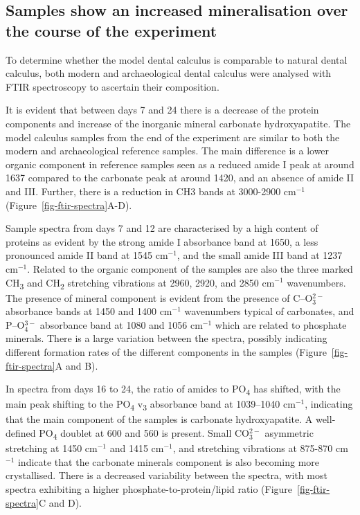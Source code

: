 \documentclass[
  b5paper,
]{book}
\begin{document}
\subsection{Samples show an increased mineralisation over the course of
the
experiment}\label{samples-show-an-increased-mineralisation-over-the-course-of-the-experiment}

To determine whether the model dental calculus is comparable to natural
dental calculus, both modern and archaeological dental calculus were
analysed with FTIR spectroscopy to ascertain their composition.

It is evident that between days 7 and 24 there is a decrease of the
protein components and increase of the inorganic mineral carbonate
hydroxyapatite. The model calculus samples from the end of the
experiment are similar to both the modern and archaeological reference
samples. The main difference is a lower organic component in reference
samples seen as a reduced amide I peak at around 1637 compared to the
carbonate peak at around 1420, and an absence of amide II and III.
Further, there is a reduction in CH3 bands at 3000-2900 cm\(^{-1}\)
(Figure~\ref{fig-ftir-spectra}A-D).

Sample spectra from days 7 and 12 are characterised by a high content of
proteins as evident by the strong amide I absorbance band at 1650, a
less pronounced amide II band at 1545 cm\(^{-1}\), and the small amide
III band at 1237 cm\(^{-1}\). Related to the organic component of the
samples are also the three marked CH\textsubscript{3} and
CH\textsubscript{2} stretching vibrations at 2960, 2920, and 2850
cm\(^{-1}\) wavenumbers. The presence of mineral component is evident
from the presence of C--O\(^{2-}_3\) absorbance bands at 1450 and 1400
cm\(^{-1}\) wavenumbers typical of carbonates, and P--O\(^{3-}_4\)
absorbance band at 1080 and 1056 cm\(^{-1}\) which are related to
phosphate minerals. There is a large variation between the spectra,
possibly indicating different formation rates of the different
components in the samples (Figure~\ref{fig-ftir-spectra}A and B).

In spectra from days 16 to 24, the ratio of amides to
PO\textsubscript{4} has shifted, with the main peak shifting to the
PO\textsubscript{4} v\textsubscript{3} absorbance band at 1039--1040
cm\(^{-1}\), indicating that the main component of the samples is
carbonate hydroxyapatite. A well-defined PO\textsubscript{4} doublet at
600 and 560 is present. Small CO\(_3^{2-}\) asymmetric stretching at
1450 cm\(^{-1}\) and 1415 cm\(^{-1}\), and stretching vibrations at
875-870 cm\(^{-1}\) indicate that the carbonate minerals component is
also becoming more crystallised. There is a decreased variability
between the spectra, with most spectra exhibiting a higher
phosphate-to-protein/lipid ratio (Figure~\ref{fig-ftir-spectra}C and D).
\end{document}
